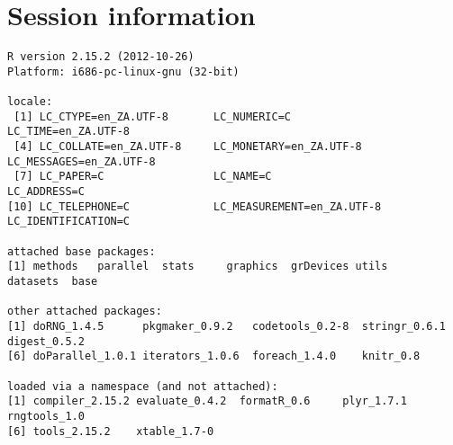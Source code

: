 \documentclass[a4paper,12pt]{article}\usepackage{graphicx, color}
\makeatletter
\newenvironment{kframe}{%
 \def\at@end@of@kframe{}%
 \ifinner\ifhmode%
  \def\at@end@of@kframe{\end{minipage}}%
  \begin{minipage}{\columnwidth}%
 \fi\fi%
 \def\FrameCommand##1{\hskip\@totalleftmargin \hskip-\fboxsep
 \colorbox{shadecolor}{##1}\hskip-\fboxsep
     \hskip-\linewidth \hskip-\@totalleftmargin \hskip\columnwidth}%
 \MakeFramed {\advance\hsize-\width
   \@totalleftmargin\z@ \linewidth\hsize
   \@setminipage}}%
 {\par\unskip\endMakeFramed%
 \at@end@of@kframe}
\newenvironment{knitrout}{}{} %
\renewenvironment{knitrout}{\begin{footnotesize}}{\end{footnotesize}}
\makeatother
\begin{document}
\section*{Session information}
\begin{knitrout}
\color{fgcolor}\begin{kframe}
\begin{verbatim}
R version 2.15.2 (2012-10-26)
Platform: i686-pc-linux-gnu (32-bit)

locale:
 [1] LC_CTYPE=en_ZA.UTF-8       LC_NUMERIC=C               LC_TIME=en_ZA.UTF-8       
 [4] LC_COLLATE=en_ZA.UTF-8     LC_MONETARY=en_ZA.UTF-8    LC_MESSAGES=en_ZA.UTF-8   
 [7] LC_PAPER=C                 LC_NAME=C                  LC_ADDRESS=C              
[10] LC_TELEPHONE=C             LC_MEASUREMENT=en_ZA.UTF-8 LC_IDENTIFICATION=C       

attached base packages:
[1] methods   parallel  stats     graphics  grDevices utils     datasets  base     

other attached packages:
[1] doRNG_1.4.5      pkgmaker_0.9.2   codetools_0.2-8  stringr_0.6.1    digest_0.5.2    
[6] doParallel_1.0.1 iterators_1.0.6  foreach_1.4.0    knitr_0.8       

loaded via a namespace (and not attached):
[1] compiler_2.15.2 evaluate_0.4.2  formatR_0.6     plyr_1.7.1      rngtools_1.0   
[6] tools_2.15.2    xtable_1.7-0   
\end{verbatim}
\end{kframe}
\end{knitrout}


\printbibliography[heading=bibintoc]
\end{document}
